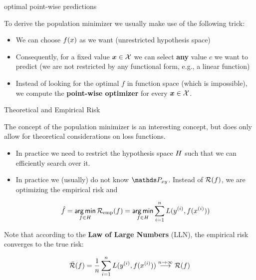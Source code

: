\begin{vbframe}{optimal point-wise predictions}  

To derive the population minimizer we usually make use of the following trick: 

\begin{itemize}
	\item We can choose $f(x)$ as we want (unrestricted hypothesis space)
	\item Consequently, for a fixed value $\bm{x} \in \mathcal{X}$ we can select \textbf{any} value $c$ we want to predict (we are not restricted by any functional form, e.g., a linear function)
	\item Instead of looking for the optimal $f$ in function space (which is impossible), we compute the \textbf{point-wise optimizer} for every $\bm{x} \in \mathcal{X}$.
\end{itemize}

\end{vbframe}

\begin{vbframe}{Theoretical and Empirical Risk}  
 

The concept of the population minimizer is an interesting concept, but does only allow for theoretical considerations on loss functions. 

\begin{itemize}
	\item In practice we need to restrict the hypothesis space $H$ such that we can efficiently search over it. 
	\item In practice we (usually) do not know $\Pxy$. Instead of $\mathcal{R}(f)$, we are optimizing the empirical risk and 

	\begin{eqnarray*}
		\hat f = \mathop{\sf arg\,min}_{f \in H} \mathcal{R}_{\text{emp}}(f) = \mathop{\sf arg\,min}_{f \in H} \sum_{i=1}^n L(y^{(i)}, f(x^{(i)}))
	\end{eqnarray*}

\end{itemize}

Note that according to the \textbf{Law of Large Numbers} (LLN), the empirical risk converges to the true risk: 

\begin{eqnarray*}
	\bar{\mathcal{R}}(f) = \frac{1}{n} \sum_{i=1}^n L(y^{(i)}, f(x^{(i)})) \overset{n \to \infty}{\longrightarrow} \mathcal{R}(f)
\end{eqnarray*}



\end{vbframe}

